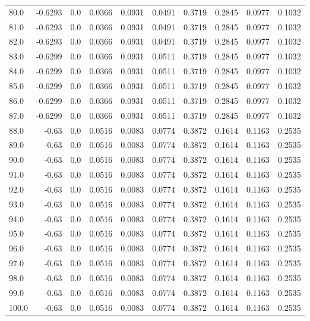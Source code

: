\begin{longtable}{lrrrrrrrrr}
80.0 & -0.6293 & 0.0 & 0.0366 & 0.0931 & 0.0491 & 0.3719 & 0.2845 & 0.0977 & 0.1032 \\
81.0 & -0.6293 & 0.0 & 0.0366 & 0.0931 & 0.0491 & 0.3719 & 0.2845 & 0.0977 & 0.1032 \\
82.0 & -0.6293 & 0.0 & 0.0366 & 0.0931 & 0.0491 & 0.3719 & 0.2845 & 0.0977 & 0.1032 \\
83.0 & -0.6299 & 0.0 & 0.0366 & 0.0931 & 0.0511 & 0.3719 & 0.2845 & 0.0977 & 0.1032 \\
84.0 & -0.6299 & 0.0 & 0.0366 & 0.0931 & 0.0511 & 0.3719 & 0.2845 & 0.0977 & 0.1032 \\
85.0 & -0.6299 & 0.0 & 0.0366 & 0.0931 & 0.0511 & 0.3719 & 0.2845 & 0.0977 & 0.1032 \\
86.0 & -0.6299 & 0.0 & 0.0366 & 0.0931 & 0.0511 & 0.3719 & 0.2845 & 0.0977 & 0.1032 \\
87.0 & -0.6299 & 0.0 & 0.0366 & 0.0931 & 0.0511 & 0.3719 & 0.2845 & 0.0977 & 0.1032 \\
88.0 & -0.63 & 0.0 & 0.0516 & 0.0083 & 0.0774 & 0.3872 & 0.1614 & 0.1163 & 0.2535 \\
89.0 & -0.63 & 0.0 & 0.0516 & 0.0083 & 0.0774 & 0.3872 & 0.1614 & 0.1163 & 0.2535 \\
90.0 & -0.63 & 0.0 & 0.0516 & 0.0083 & 0.0774 & 0.3872 & 0.1614 & 0.1163 & 0.2535 \\
91.0 & -0.63 & 0.0 & 0.0516 & 0.0083 & 0.0774 & 0.3872 & 0.1614 & 0.1163 & 0.2535 \\
92.0 & -0.63 & 0.0 & 0.0516 & 0.0083 & 0.0774 & 0.3872 & 0.1614 & 0.1163 & 0.2535 \\
93.0 & -0.63 & 0.0 & 0.0516 & 0.0083 & 0.0774 & 0.3872 & 0.1614 & 0.1163 & 0.2535 \\
94.0 & -0.63 & 0.0 & 0.0516 & 0.0083 & 0.0774 & 0.3872 & 0.1614 & 0.1163 & 0.2535 \\
95.0 & -0.63 & 0.0 & 0.0516 & 0.0083 & 0.0774 & 0.3872 & 0.1614 & 0.1163 & 0.2535 \\
96.0 & -0.63 & 0.0 & 0.0516 & 0.0083 & 0.0774 & 0.3872 & 0.1614 & 0.1163 & 0.2535 \\
97.0 & -0.63 & 0.0 & 0.0516 & 0.0083 & 0.0774 & 0.3872 & 0.1614 & 0.1163 & 0.2535 \\
98.0 & -0.63 & 0.0 & 0.0516 & 0.0083 & 0.0774 & 0.3872 & 0.1614 & 0.1163 & 0.2535 \\
99.0 & -0.63 & 0.0 & 0.0516 & 0.0083 & 0.0774 & 0.3872 & 0.1614 & 0.1163 & 0.2535 \\
100.0 & -0.63 & 0.0 & 0.0516 & 0.0083 & 0.0774 & 0.3872 & 0.1614 & 0.1163 & 0.2535 \\

\end{longtable}
